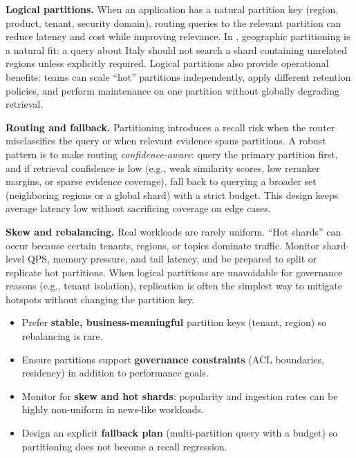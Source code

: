 \textbf{Logical partitions.} When an application has a natural partition key (region, product, tenant, security domain), routing queries to the relevant partition can reduce latency and cost while improving relevance. In \ishtar{}, geographic partitioning is a natural fit: a query about Italy should not search a shard containing unrelated regions unless explicitly required. Logical partitions also provide operational benefits: teams can scale ``hot'' partitions independently, apply different retention policies, and perform maintenance on one partition without globally degrading retrieval.

\textbf{Routing and fallback.} Partitioning introduces a recall risk when the router misclassifies the query or when relevant evidence spans partitions. A robust pattern is to make routing \emph{confidence-aware}: query the primary partition first, and if retrieval confidence is low (e.g., weak similarity scores, low reranker margins, or sparse evidence coverage), fall back to querying a broader set (neighboring regions or a global shard) with a strict budget. This design keeps average latency low without sacrificing coverage on edge cases.

\textbf{Skew and rebalancing.} Real workloads are rarely uniform. ``Hot shards'' can occur because certain tenants, regions, or topics dominate traffic. Monitor shard-level QPS, memory pressure, and tail latency, and be prepared to split or replicate hot partitions. When logical partitions are unavoidable for governance reasons (e.g., tenant isolation), replication is often the simplest way to mitigate hotspots without changing the partition key.

\begin{tcolorbox}[
  title={\textbf{Engineering sidebar: Designing shard keys for RAG}},
  colback=yellow!5,
  colframe=yellow!40!black,
  colbacktitle=yellow!20,
  coltitle=black,
  fonttitle=\bfseries,
  boxrule=0.7pt,
  arc=4pt,
  left=5mm, right=5mm, top=4mm, bottom=4mm,
  before skip=6pt,
  after skip=6pt
]
\small
\begin{itemize}[leftmargin=1.5em, itemsep=3pt]
  \item Prefer \textbf{stable, business-meaningful} partition keys (tenant, region) so rebalancing is rare.
  \item Ensure partitions support \textbf{governance constraints} (ACL boundaries, residency) in addition to performance goals.
  \item Monitor for \textbf{skew and hot shards}: popularity and ingestion rates can be highly non-uniform in news-like workloads.
  \item Design an explicit \textbf{fallback plan} (multi-partition query with a budget) so partitioning does not become a recall regression.
\end{itemize}
\end{tcolorbox}

